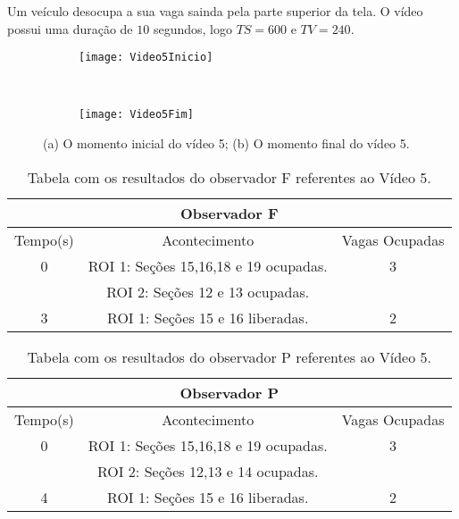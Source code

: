 Um veículo desocupa a sua vaga sainda pela parte superior da tela. O vídeo possui uma duração de $10$ segundos, logo $TS = 600$ e $TV = 240$.

\begin{figure}[H]
\centering
\begin{subfigure}{.5\textwidth}
\centering
\texttt{[image: Video5Inicio]}
\caption{}
\end{subfigure}\
\begin{subfigure}{.5\textwidth}
\centering
\texttt{[image: Video5Fim]}
\caption{}
\end{subfigure}
\centering
\caption{(a) O momento inicial do vídeo 5; (b) O momento final do vídeo 5.}%
\label{}%
\end{figure}

\begin{table}[H]
\begin{center}
\begin{tabular}{|c||c||c|}
\hline
\multicolumn{3}{|c|}{Observador F}  \\ \hline \hline
Tempo(s) & Acontecimento & Vagas Ocupadas\\ \hline
0 & ROI 1: Seções 15,16,18 e 19 ocupadas. & 3 \\
 & ROI 2: Seções 12 e 13 ocupadas. &  \\ \hline
3 & ROI 1: Seções 15 e 16 liberadas. & 2 \\
\hline
\end{tabular}
\end{center}
\caption{Tabela com os resultados do observador F referentes ao Vídeo 5.}
\label{tab:video5F}
\end{table}

\begin{table}[H]
\begin{center}
\begin{tabular}{|c||c||c|}
\hline
\multicolumn{3}{|c|}{Observador P}  \\ \hline \hline
Tempo(s) & Acontecimento & Vagas Ocupadas\\ \hline
0 & ROI 1: Seções 15,16,18 e 19 ocupadas. & 3 \\
 & ROI 2: Seções 12,13 e 14 ocupadas. &  \\ \hline
4 & ROI 1: Seções 15 e 16 liberadas. & 2 \\
\hline
\end{tabular}
\end{center}
\caption{Tabela com os resultados do observador P referentes ao Vídeo 5.}
\label{tab:video5P}
\end{table}

